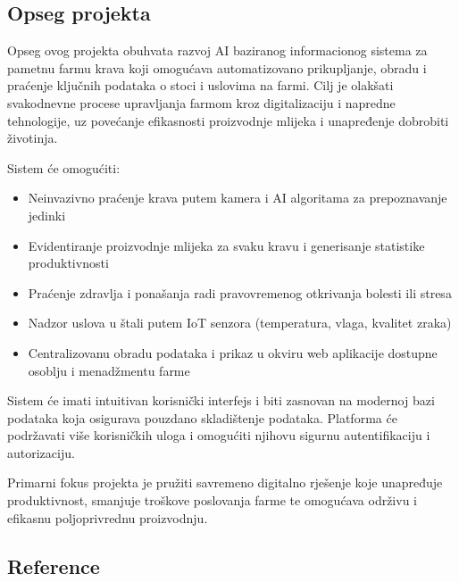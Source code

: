 \documentclass{article}
\begin{document}
\subsection{Opseg projekta}

Opseg ovog projekta obuhvata razvoj AI baziranog informacionog sistema za pametnu farmu krava koji omogućava automatizovano prikupljanje, obradu i praćenje ključnih podataka o stoci i uslovima na farmi. Cilj je olakšati svakodnevne procese upravljanja farmom kroz digitalizaciju i napredne tehnologije, uz povećanje efikasnosti proizvodnje mlijeka i unapređenje dobrobiti životinja.

Sistem će omogućiti:

\begin{itemize}
 \item Neinvazivno praćenje krava putem kamera i AI algoritama za prepoznavanje jedinki
 \item Evidentiranje proizvodnje mlijeka za svaku kravu i generisanje statistike produktivnosti
 \item Praćenje zdravlja i ponašanja radi pravovremenog otkrivanja bolesti ili stresa
 \item Nadzor uslova u štali putem IoT senzora (temperatura, vlaga, kvalitet zraka)
 \item Centralizovanu obradu podataka i prikaz u okviru web aplikacije dostupne osoblju i menadžmentu farme
\end{itemize}

Sistem će imati intuitivan korisnički interfejs i biti zasnovan na modernoj bazi podataka koja osigurava pouzdano skladištenje podataka. Platforma će podržavati više korisničkih uloga i omogućiti njihovu sigurnu autentifikaciju i autorizaciju.

Primarni fokus projekta je pružiti savremeno digitalno rješenje koje unapređuje produktivnost, smanjuje troškove poslovanja farme te omogućava održivu i efikasnu poljoprivrednu proizvodnju.

\subsection{Reference}
\end{document}
